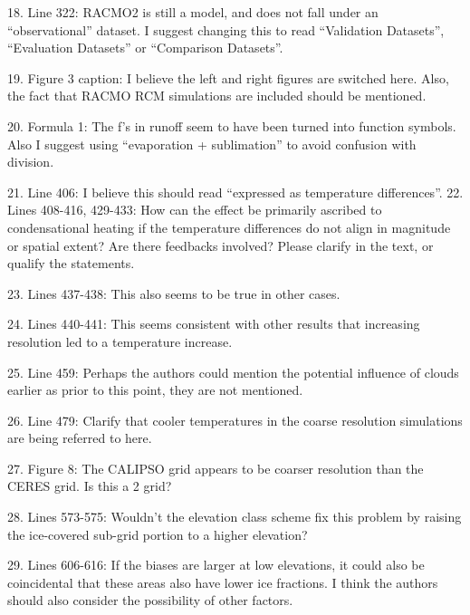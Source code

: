 \documentclass[12pt,oneside,a4paper]{article}%
\begin{document}
18. Line 322: RACMO2 is still a model, and does not fall under an “observational” dataset. I suggest changing this to read “Validation Datasets”, “Evaluation Datasets” or “Comparison Datasets”. \newline

19. Figure 3 caption: I believe the left and right figures are switched here. Also, the fact that RACMO RCM simulations are included should be mentioned. \newline

20. Formula 1: The f’s in runoff seem to have been turned into function symbols. Also I suggest using “evaporation + sublimation” to avoid confusion with division. \newline

21. Line 406: I believe this should read “expressed as temperature differences”. 22. Lines 408-416, 429-433: How can the effect be primarily ascribed to condensational heating if the temperature differences do not align in magnitude or spatial extent? Are there feedbacks involved? Please clarify in the text, or qualify the statements. \newline

23. Lines 437-438: This also seems to be true in other cases. \newline

24. Lines 440-441: This seems consistent with other results that increasing resolution led to a temperature increase. \newline

25. Line 459: Perhaps the authors could mention the potential influence of clouds earlier as prior to this point, they are not mentioned. \newline

26. Line 479: Clarify that cooler temperatures in the coarse resolution simulations are being referred to here. \newline

27. Figure 8: The CALIPSO grid appears to be coarser resolution than the CERES grid. Is this a 2 grid? \newline

28. Lines 573-575: Wouldn’t the elevation class scheme fix this problem by raising the ice-covered sub-grid portion to a higher elevation? \newline

29. Lines 606-616: If the biases are larger at low elevations, it could also be coincidental that these areas also have lower ice fractions. I think the authors should also consider the possibility of other factors. \newline
\end{document}
